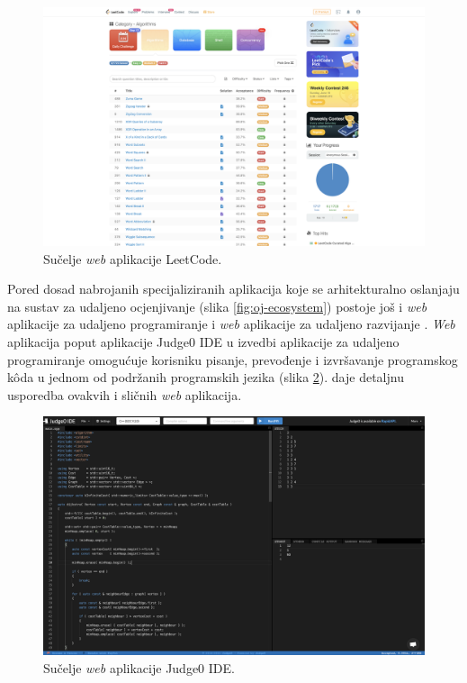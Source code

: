 \documentclass[times, utf8, diplomski]{fer}
\begin{document}
\begin{figure}[htb]
	\centering
	\includegraphics[width=\textwidth]{images/leetcode-ui.png}
	\caption{
		Sučelje \textit{web} aplikacije LeetCode.
	}
	\label{fig:leetcode-ui}
\end{figure}

Pored dosad nabrojanih specijaliziranih aplikacija koje se arhitekturalno oslanjaju na sustav za udaljeno ocjenjivanje (slika \ref{fig:oj-ecosystem}) postoje još i \textit{web} aplikacije za udaljeno programiranje  i \textit{web} aplikacije za udaljeno razvijanje . \textit{Web} aplikacija poput aplikacije Judge0 IDE \citep{Judge0IDE} u izvedbi aplikacije za udaljeno programiranje omogućuje korisniku pisanje, prevođenje i izvršavanje programskog kôda u jednom od podržanih programskih jezika (slika \ref{fig:judge0-ide-ui}). \citep{wasik2018survey} daje detaljnu usporedba ovakvih i sličnih \textit{web} aplikacija.

\begin{figure}[htb]
	\centering
	\includegraphics[width=\textwidth]{images/judge0-ide-ui.png}
	\caption{
		Sučelje \textit{web} aplikacije Judge0 IDE.
	}
	\label{fig:judge0-ide-ui}
\end{figure}
\end{document}
